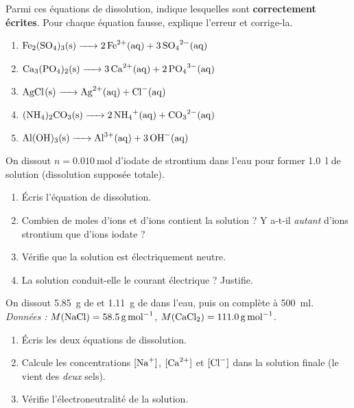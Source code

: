 \documentclass[11pt,a4paper]{article}
\begin{document}
\begin{exo}
Parmi ces équations de dissolution, indique lesquelles sont \textbf{correctement écrites}. Pour chaque
équation fausse, explique l'erreur et corrige-la.
\begin{enumerate}[label=\alph*)]
  \item $\ce{Fe2(SO4)3(s) -> 2 Fe^{2+}(aq) + 3 SO4^{2-}(aq)}$
  \item $\ce{Ca3(PO4)2(s) -> 3 Ca^{2+}(aq) + 2 PO4^{3-}(aq)}$
  \item $\ce{AgCl(s) -> Ag^{2+}(aq) + Cl^{-}(aq)}$
  \item $\ce{(NH4)2CO3(s) -> 2 NH4^{+}(aq) + CO3^{2-}(aq)}$
  \item $\ce{Al(OH)3(s) -> Al^{3+}(aq) + 3 OH^{-}(aq)}$
\end{enumerate}
\end{exo}

\begin{exo}
On dissout $n=\qty{0.010}{\mole}$ d'iodate de strontium  dans l'eau pour former
\qty{1.0}{\litre} de solution (dissolution supposée totale).
\begin{enumerate}[label=\alph*)]
  \item Écris l'équation de dissolution.
  \item Combien de moles d'ions  et d'ions  contient la solution ? Y a-t-il
        \emph{autant} d'ions strontium que d'ions iodate ?
  \item Vérifie que la solution est électriquement neutre.
  \item La solution conduit-elle le courant électrique ? Justifie.
\end{enumerate}
\end{exo}

\begin{exo}
On dissout \qty{5.85}{\gram} de  et \qty{1.11}{\gram} de  dans l'eau, puis on
complète à \qty{500}{\milli\litre}. \emph{Données :} $M(\ce{NaCl})=\qty{58.5}{\gram\per\mole}$,
$M(\ce{CaCl2})=\qty{111.0}{\gram\per\mole}$.
\begin{enumerate}[label=\alph*)]
  \item Écris les deux équations de dissolution.
  \item Calcule les concentrations $[\ce{Na+}]$, $[\ce{Ca^{2+}}]$ et $[\ce{Cl-}]$ dans la solution
        finale (le  vient des \emph{deux} sels).
  \item Vérifie l'électroneutralité de la solution.
\end{enumerate}
\end{exo}
\end{document}
